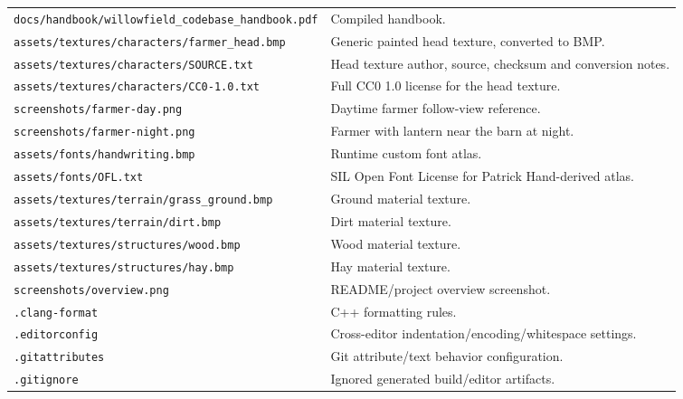 \documentclass[11pt,a4paper,openany]{book}
\newcommand{\file}[1]{\nolinkurl{#1}}
\newcommand{\pathrow}[2]{\file{#1} & #2\\}
\begin{document}
\begin{longtable}{@{}p{}p{}@{}}
	\pathrow{docs/handbook/willowfield_codebase_handbook.pdf}{Compiled handbook.}
	\pathrow{assets/textures/characters/farmer_head.bmp}{Generic painted head texture, converted to BMP.}
	\pathrow{assets/textures/characters/SOURCE.txt}{Head texture author, source, checksum and conversion notes.}
	\pathrow{assets/textures/characters/CC0-1.0.txt}{Full CC0 1.0 license for the head texture.}
	\pathrow{screenshots/farmer-day.png}{Daytime farmer follow-view reference.}
	\pathrow{screenshots/farmer-night.png}{Farmer with lantern near the barn at night.}
	\pathrow{assets/fonts/handwriting.bmp}{Runtime custom font atlas.}
	\pathrow{assets/fonts/OFL.txt}{SIL Open Font License for Patrick Hand-derived atlas.}
	\pathrow{assets/textures/terrain/grass\_ground.bmp}{Ground material texture.}
	\pathrow{assets/textures/terrain/dirt.bmp}{Dirt material texture.}
	\pathrow{assets/textures/structures/wood.bmp}{Wood material texture.}
	\pathrow{assets/textures/structures/hay.bmp}{Hay material texture.}
	\pathrow{screenshots/overview.png}{README/project overview screenshot.}
	\pathrow{.clang-format}{C++ formatting rules.}
	\pathrow{.editorconfig}{Cross-editor indentation/encoding/whitespace settings.}
	\pathrow{.gitattributes}{Git attribute/text behavior configuration.}
	\pathrow{.gitignore}{Ignored generated build/editor artifacts.}
	\bottomrule
\end{longtable}
\end{document}
